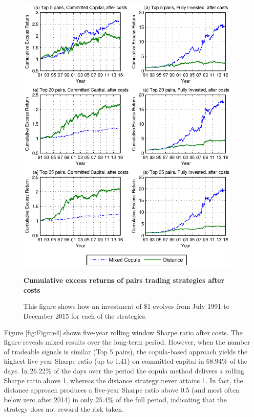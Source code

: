\begin{figure}[!ht]
	\centering
	\includegraphics[width=\linewidth]{Figure3.eps}
	\captionsetup{justification=raggedright,
		singlelinecheck=false
	}
	\caption{\textbf{Cumulative excess returns of pairs trading strategies after costs}}
	\caption*{\scriptsize This figure shows how an investment of \$1 evolves from July 1991 to December 2015 for each of the strategies.}
	\label{fig:Figure3}
\end{figure}

Figure \ref{fig:Figure4} shows five-year rolling window Sharpe ratio after costs. The figure reveals mixed results over the long-term period. However, when the number of tradeable signals is similar (Top 5 pairs), the copula-based approach yields the highest five-year Sharpe ratio (up to 1.41) on committed capital in 68.94\% of the days. In 26.22\% of the days over the period the copula method delivers a rolling Sharpe ratio above 1, whereas the distance strategy never attains 1. In fact, the distance approach produces a five-year Sharpe ratio above 0.5 (and most often below zero after 2014) in only 25.4\% of the full period, indicating that the strategy does not reward the risk taken.

